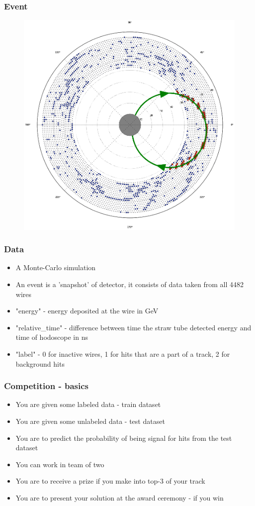\documentclass[luatex,mathserif,serif,utf8,table]{beamer}
\begin{document}
\begin{frame}[c]
  \frametitle{Event}
  \begin{figure}
    \centering
    \includegraphics[height=0.9\textheight]{event.png}
  \end{figure}
\end{frame}

\begin{frame}
  \frametitle{Data}
  \begin{itemize}
  \item A Monte-Carlo simulation
  \item An event is a 'snapshot' of detector, it consists of data
    taken from all 4482 wires
  \item "energy" - energy deposited at the wire in GeV
  \item "relative\_time" - difference between time the straw tube
    detected energy and time of hodoscope in ns
  \item "label" - 0 for inactive wires, 1 for hits that are a part of
    a track, 2 for background hits
  \end{itemize}
\end{frame}

\begin{frame}
  \frametitle{Competition - basics}
  \begin{itemize}
  \item You are given some labeled data - train dataset
  \item You are given some unlabeled data - test dataset
  \item You are to predict the probability of being signal for hits from the test dataset
  \item You can work in team of two
  \item You are to receive a prize if you make into top-3 of your track
  \item You are to present your solution at the award ceremony - if you win
  \end{itemize}
\end{frame}
\end{document}
